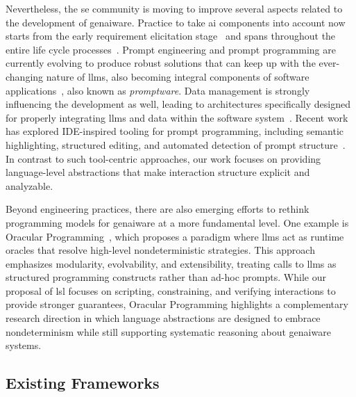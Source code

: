 \documentclass[manuscript,screen]{acmart}
\begin{document}
Nevertheless, the \ac{se} community is moving to improve several aspects related to the development of \ac{genai}ware. %
Practice to take \ac{ai} components into account now starts from the early requirement elicitation stage~\cite{10771003} and spans throughout the entire life cycle processes~\cite{ISOIEC5338}.
Prompt engineering and prompt programming are currently evolving to produce robust solutions that can keep up with the ever-changing nature of \acp{llm}, also becoming integral components of software applications~\cite{DBLP:journals/corr/abs-2503-02400,DBLP:journals/pacmse/LiangLRM25}, also known as \emph{promptware}.
Data management is strongly influencing the development as well, leading to architectures specifically designed for properly integrating \acp{llm} and data within the software system~\cite{DBLP:conf/cain/BarnettKTB024,DBLP:conf/icse/Shao0S00025}.
Recent work has explored IDE-inspired tooling for prompt programming, including semantic highlighting, structured editing, and automated detection of prompt structure~\cite{10.1145/3544549.3585737}.
In contrast to such tool-centric approaches, our work focuses on providing language-level abstractions that make interaction structure explicit and analyzable.

Beyond engineering practices, there are also emerging efforts to rethink programming models for \ac{genai}ware at a more fundamental level. One example is Oracular Programming~\cite{oracular-programming-2025}, which proposes a paradigm where \acp{llm} act as runtime oracles that resolve high-level nondeterministic strategies. This approach emphasizes modularity, evolvability, and extensibility, treating calls to \acp{llm} as structured programming constructs rather than ad-hoc prompts. While our proposal of \ac{lsl} focuses on scripting, constraining, and verifying interactions to provide stronger guarantees, Oracular Programming highlights a complementary research direction in which language abstractions are designed to embrace nondeterminism while still supporting systematic reasoning about \ac{genai}ware systems.

\subsection{Existing Frameworks}
\label{sec:existingframeworks}
\end{document}
